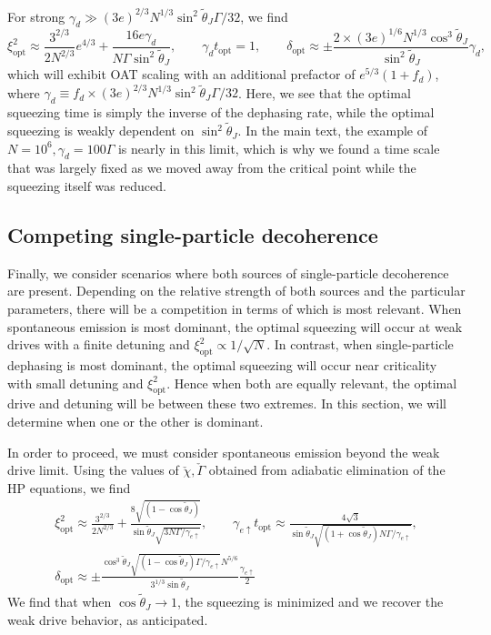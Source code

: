 \documentclass[11pt]{article}
\begin{document}
For strong $\gamma_d \gg (3 e)^{2/3} N^{1/3} \sin^2 \tilde{\theta}_J \Gamma/32$, we find
\begin{equation}
    \xi^2_{\text{opt}} \approx \frac{3^{2/3} }{2 N^{2/3}} e^{4/3} + \frac{16 e \gamma_d}{N \Gamma \sin^2 \tilde{\theta}_J} , \qquad \gamma_d t_{\text{opt}} = 1, \qquad \delta_{\text{opt}} \approx \pm \frac{2 \times (3 e)^{1/6} N^{1/3} \cos^3 \tilde{\theta}_J }{\sin^2 \tilde{\theta}_J} \gamma_d,
\end{equation}
which will exhibit OAT scaling with an additional prefactor of $e^{5/3}(1+f_d)$, where $\gamma_d \equiv f_d \times (3 e)^{2/3} N^{1/3} \sin^2 \tilde{\theta}_J \Gamma/32$. Here, we see that the optimal squeezing time is simply the inverse of the dephasing rate, while the optimal squeezing is weakly dependent on $\sin^2 \tilde{\theta}_J$. In the main text, the example of $N= 10^6, \gamma_d = 100 \Gamma$ is nearly in this limit, which is why we found a time scale that was largely fixed as we moved away from the critical point while the squeezing itself was reduced. 
 
\subsection{Competing single-particle decoherence}

Finally, we consider scenarios where both sources of single-particle decoherence are present. Depending on the relative strength of both sources and the particular parameters, there will be a competition in terms of which is most relevant. When spontaneous emission is most dominant, the optimal squeezing will occur at weak drives with a finite detuning and $\xi^2_{\text{opt}} \propto 1/\sqrt{N}$. In contrast, when single-particle dephasing is most dominant, the optimal squeezing will occur near criticality with small detuning and $\xi^2_{\text{opt}}$. Hence when both are equally relevant, the optimal drive and detuning will be between these two extremes. In this section, we will determine when one or the other is dominant. 

In order to proceed, we must consider spontaneous emission beyond the weak drive limit. Using the values of $\check \chi, \check \Gamma$ obtained from adiabatic elimination of the HP equations, we find
\begin{equation}
\begin{gathered}
    \xi^2_{\text{opt}} \approx \frac{3^{2/3}}{2 N^{2/3}} + \frac{8 \sqrt{(1-\cos \tilde{\theta}_J)}}{\sin \tilde{\theta}_J \sqrt{3 N \Gamma /\gamma_{e \uparrow}} }, \qquad \gamma_{e \uparrow} t_{\text{opt}} \approx \frac{4 \sqrt{3}}{  \sin \tilde{\theta}_J \sqrt{ (1+\cos \tilde{\theta}_J) N  \Gamma / \gamma_{e \uparrow}}}, \\
    \delta_{\text{opt}} \approx \pm \frac{\cos^3 \tilde{\theta}_J \sqrt{(1- \cos \tilde{\theta}_J)  \Gamma/ \gamma_{e \uparrow}} N^{5/6}}{3^{1/3} \sin \tilde{\theta}_J} \frac{\gamma_{e \uparrow}}{2}
\end{gathered}
\end{equation}
We find that when $\cos \tilde{\theta}_J \to 1$, the squeezing is minimized and we recover the weak drive behavior, as anticipated. 
\end{document}
